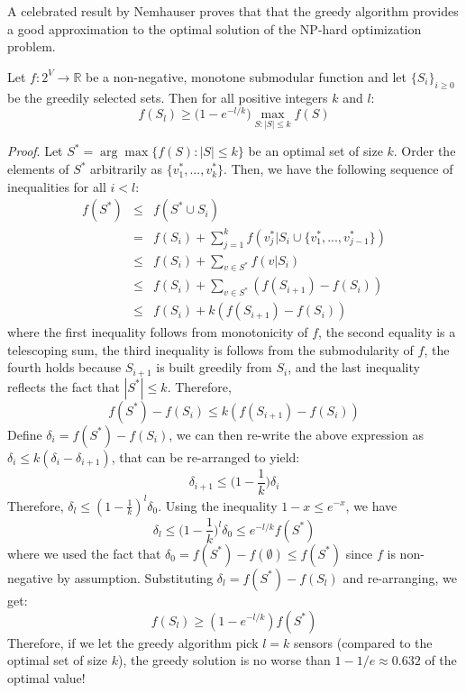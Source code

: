 A celebrated result by Nemhauser \cite{Nemhauser78} proves that that the greedy algorithm provides a good approximation to the optimal solution of the NP-hard optimization problem. 
\begin{theorem}
Let $f : 2^{V} \rightarrow \mathbb{R}$ be a non-negative, monotone submodular function and let $\{S_i\}_{i \geq 0}$ be the greedily selected sets. Then for all positive integers $k$ and $l$:
\begin{equation}
    f(S_l) \geq \bigg(1 - e^{-l/k} \bigg) \max_{S:|S|\leq k} f(S)
\end{equation}
\end{theorem}
\textit{Proof}. Let $S^{\ast} = \arg \max \{f(S): |S| \leq k \}$ be an optimal set of size $k$. Order the elements of $S^{\ast}$ arbitrarily as $\{v_{1}^{\ast},...,v_{k}^{\ast}\}$. Then, we have the following sequence of inequalities for all $i < l$:
\begin{eqnarray}
    f(S^{\ast}) &\leq& f(S^{\ast}\cup S_i) \\
                &=& f(S_i) + \sum_{j=1}^{k} f(v_{j}^{\ast}| S_i \cup \{v_{1}^{\ast},...,v_{j-1}^{\ast}\}) \\
                &\leq& f(S_i) + \sum_{v\in S^{\ast}} f(v|S_i)\\
                &\leq& f(S_i) + \sum_{v\in S^{\ast}} (f(S_{i+1})-f(S_i)) \\
                &\leq& f(S_i) + k(f(S_{i+1})-f(S_i))
\end{eqnarray}
where the first inequality follows from monotonicity of $f$, the second equality is a telescoping sum, the third inequality is follows from the submodularity of $f$, the fourth holds because $S_{i+1}$ is built greedily from $S_i$, and the last inequality reflects the fact that $|S^{\ast}| \leq k$. Therefore,
\begin{equation}
    f(S^{\ast}) - f(S_i) \leq k(f(S_{i+1})-f(S_i))
\end{equation}
Define $\delta_i = f(S^{\ast}) - f(S_i)$, we can then re-write the above expression as $\delta_i \leq k (\delta_i - \delta_{i+1})$, that can be re-arranged to yield:
\begin{equation}
    \delta_{i+1} \leq \bigg(1-\frac{1}{k}\bigg) \delta_i
\end{equation}
Therefore, $\delta_l \leq (1-\frac{1}{k})^{l}\delta_0$. Using the inequality $1-x \leq e^{-x}$, we have
\begin{equation}
    \delta_l \leq \bigg(1-\frac{1}{k}\bigg)^{l}\delta_0 \leq e^{-l/k}f(S^{\ast})
\end{equation}
where we used the fact that $\delta_0 = f(S^{\ast}) - f(\emptyset) \leq f(S^{\ast})$ since $f$ is non-negative by assumption. Substituting $\delta_l = f(S^{\ast}) - f(S_l)$ and re-arranging, we get:
\begin{equation}
    f(S_l) \geq (1-e^{-l/k})f(S^{\ast})
\end{equation}
Therefore, if we let the greedy algorithm pick $l=k$ sensors (compared to the optimal set of size $k$), the greedy solution is no worse than $1-1/e \approx 0.632$ of the optimal value!\\

